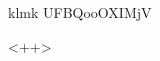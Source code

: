 
\begin{mental}
    klmk
UFBQooOXIMjV


\begin{center}                                                                                                                                                                                                                                                                                                                                                           
\end{center} 


\begin{center}
   
\end{center}

\end{mental}
<++>
